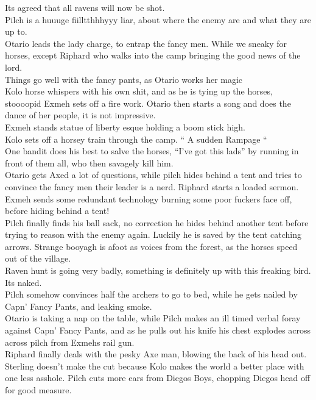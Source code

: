 Its agreed that all ravens will now be shot.\\
Pilch is a huuuge fiilltthhhyyy liar, about where the enemy are and what they are up to.\\
Otario leads the lady charge, to entrap the fancy men. While we sneaky for horses, except Riphard who walks into the camp bringing the good news of the lord.\\
Things go well with the fancy pants, as Otario works her magic\\
Kolo horse whispers with his own shit, and as he is tying up the horses, stoooopid Exmeh sets off a fire work. Otario then starts a song and does the dance of her people, it is not impressive.\\
Exmeh stands statue of liberty esque holding a boom stick high.\\
Kolo sets off a horsey train through the camp. “ A sudden Rampage “\\
One bandit does his best to salve the horses, “I’ve got this lads” by running in front of them all, who then savagely kill him.\\
Otario gets Axed a lot of questions, while pilch hides behind a tent and tries to convince the fancy men their leader is a nerd. Riphard starts a loaded sermon. Exmeh sends some redundant technology burning some poor fuckers face off, before hiding behind a tent!\\
Pilch finally finds his ball sack, no correction he hides behind another tent before trying to reason with the enemy again. Luckily he is saved by the tent catching arrows. Strange booyagh is afoot as voices from the forest, as the horses speed out of the village.\\
Raven hunt is going very badly, something is definitely up with this freaking bird. Its naked.\\
Pilch somehow convinces half the archers to go to bed, while he gets nailed by Capn’ Fancy Pants, and leaking smoke.\\
Otario is taking a nap on the table, while Pilch makes an ill timed verbal foray against Capn’ Fancy Pants, and as he pulls out his knife his chest explodes across across pilch from Exmehs rail gun.\\
Riphard finally deals with the pesky Axe man, blowing the back of his head out.\\
Sterling doesn’t make the cut because Kolo makes the world a better place with one less asshole. Pilch cuts more ears from Diegos Boys, chopping Diegos head off for good measure.\\
